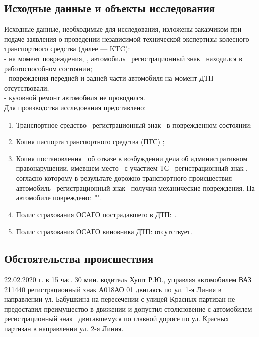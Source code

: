 \setcounter{page}{1}








\subsection{Исходные данные и объекты исследования} 
Исходные  данные,  необходимые  для   исследования,  изложены   заказчиком при подаче заявления о проведении  независимой технической экспертизы   колесного  транспортного  средства (далее —  KTC):\\
- на момент повреждения, , автомобиль \, регистрационный знак \, находился в работоспособном состоянии;\\
- повреждения передней и задней части автомобиля на момент ДТП отсутствовали;\\
- кузовной ремонт автомобиля не проводился.\\
  
Для производства исследования представлено:
\begin{enumerate}
\item Транспортное средство \, регистрационный знак   \, в поврежденном состоянии;
\item Копия паспорта транспортного средства (ПТС) ;
\item Копия постановления \, об отказе в возбуждении дела об административном правонарушении, %
 имевшем место    \, с участием  ТС \, регистрационный знак  , \, согласно которому  в результате дорожно-транспортного происшествия автомобиль \, регистрационный знак   \, получил механические повреждения. На автомобиле повреждено:\, "".
\item Полис страхования  ОСАГО пострадавшего в ДТП: \polis.
\item Полис страхования ОСАГО виновника ДТП: отсутствует.
	\end{enumerate}
%
\subsection*{Обстоятельства происшествия}
22.02.2020 г. в 15 час. 30 мин. водитель Хушт Р.Ю., управляя автомобилем ВАЗ 211440 регистрационный знак А018АО 01 двигаясь по ул. 1-я Линия в направлении ул. Бабушкина на пересечении с улицей Красных партизан не предоставил преимущество в движении и допустил столкновение с автомобилем \tc\, регистрационный знак \, двигавшемуся по главной дороге по ул. Красных партизан в направлении ул. 2-я Линия.
%
%
